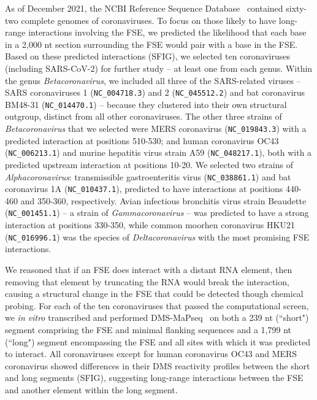 \documentclass[main.tex]{subfiles}
\begin{document}
As of December 2021, the NCBI Reference Sequence Database~\cite{OLeary2016} contained sixty-two complete genomes of coronaviruses.
To focus on those likely to have long-range interactions involving the FSE, we predicted the likelihood that each base in a 2,000 nt section surrounding the FSE would pair with a base in the FSE.
Based on these predicted interactions (SFIG), we selected ten coronaviruses (including SARS-CoV-2) for further study -- at least one from each genus.
Within the genus \textit{Betacoronavirus}, we included all three of the SARS-related viruses -- SARS coronaviruses 1 (\verb|NC_004718.3|) and 2 (\verb|NC_045512.2|) and bat coronavirus BM48-31 (\verb|NC_014470.1|) -- because they clustered into their own structural outgroup, distinct from all other coronaviruses.
The other three strains of \textit{Betacoronavirus} that we selected were MERS coronavirus (\verb|NC_019843.3|) with a predicted interaction at positions 510-530; and human coronavirus OC43 (\verb|NC_006213.1|) and murine hepatitis virus strain A59 (\verb|NC_048217.1|), both with a predicted upstream interaction at positions 10-20.
We selected two strains of \textit{Alphacoronavirus}: transmissible gastroenteritis virus (\verb|NC_038861.1|) and bat coronavirus 1A (\verb|NC_010437.1|), predicted to have interactions at positions 440-460 and 350-360, respectively.
Avian infectious bronchitis virus strain Beaudette (\verb|NC_001451.1|) -- a strain of \textit{Gammacoronavirus} -- was predicted to have a strong interaction at positions 330-350, while common moorhen coronavirus HKU21 (\verb|NC_016996.1|) was the species of \textit{Deltacoronavirus} with the most promising FSE interactions.

We reasoned that if an FSE does interact with a distant RNA element, then removing that element by truncating the RNA would break the interaction, causing a structural change in the FSE that could be detected though chemical probing.
For each of the ten coronaviruses that passed the computational screen, we \textit{in vitro} transcribed and performed DMS-MaPseq~\cite{Zubradt2016} on both a 239 nt (``short") segment comprising the FSE and minimal flanking sequences and a 1,799 nt (``long") segment encompassing the FSE and all sites with which it was predicted to interact.
All coronaviruses except for human coronavirus OC43 and MERS coronavirus showed differences in their DMS reactivity profiles between the short and long segments (SFIG), suggesting long-range interactions between the FSE and another element within the long segment.
\end{document}
